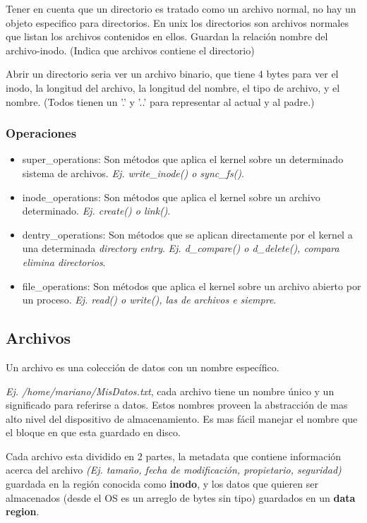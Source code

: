 \documentclass[titlepage,a4paper]{article}
\begin{document}
Tener en cuenta que un directorio es tratado como un archivo normal, no hay un objeto especifico para directorios. En unix los directorios son archivos normales que listan los archivos contenidos en ellos. Guardan la relación nombre del archivo-inodo. (Indica que archivos contiene el directorio)

Abrir un directorio seria ver un archivo binario, que tiene 4 bytes para ver el inodo, la longitud del archivo, la longitud del nombre, el tipo de archivo, y el nombre. (Todos tienen un '.' y '..' para representar al actual y al padre.)


\subsubsection*{Operaciones}
\begin{itemize}
    \item super\_operations: Son métodos que aplica el kernel sobre un determinado sistema de archivos. \textit{Ej. write\_inode() o sync\_fs()}.
    \item inode\_operations: Son métodos que aplica el kernel sobre un archivo determinado. \textit{Ej. create() o link()}.
    \item dentry\_operations: Son métodos que se aplican directamente por el kernel a una determinada \emph{directory entry}. \textit{Ej. d\_compare() o d\_delete(), compara elimina directorios}.
    \item file\_operations: Son métodos que aplica el kernel sobre un archivo abierto por un proceso. \textit{Ej. read() o write(), las de archivos e siempre}.
\end{itemize}

\subsection*{Archivos}

Un archivo es una colección de datos con un nombre específico. 

\textit{Ej. /home/mariano/MisDatos.txt}, cada archivo tiene un nombre único y un significado para referirse a datos. Estos nombres proveen la abstracción de mas alto nivel del dispositivo de almacenamiento. Es mas fácil manejar el nombre que el bloque en que esta guardado en disco.

Cada archivo esta dividido en 2 partes, la metadata que contiene información acerca del archivo \textit{(Ej. tamaño, fecha de modificación, propietario, seguridad)} guardada en la región conocida como \textbf{inodo}, y los datos que quieren ser almacenados (desde el OS es un arreglo de bytes sin tipo) guardados en un \textbf{data region}.
\end{document}
